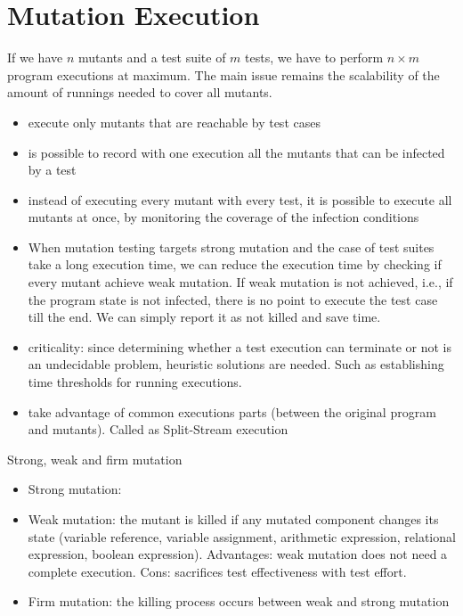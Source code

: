 
\section{Mutation Execution}\label{sec:execution}

If we have $n$ mutants and a test suite of $m$ tests, we have to perform $n \times m$ program executions at maximum.
The main issue remains the scalability of the amount of runnings needed to cover all mutants.

\begin{itemize}
	\item execute only mutants that are reachable by test cases
	\item is possible to record with one execution all the mutants that can be infected by a test
	\item instead of executing every mutant with every test, it is possible to execute all mutants at once, by monitoring the coverage of the infection conditions
	\item When mutation testing targets strong mutation and the case of test suites take a long execution time, we can reduce the execution time by checking if every mutant achieve weak mutation.
	If weak mutation is not achieved, i.e., if the program state is not infected, there is no point to execute the test case till the end. We can simply report it as not killed and save time.
	\item criticality: since determining whether a test execution can terminate or not is an undecidable problem, heuristic solutions are needed. Such as establishing time thresholds for running executions.
	\item take advantage of common executions parts (between the original program and mutants). Called as Split-Stream execution
\end{itemize} 

Strong, weak and firm mutation
\begin{itemize}
	\item Strong mutation:
	\item Weak mutation: the mutant is killed if any mutated component changes its state (variable reference, variable assignment, arithmetic expression, relational expression, boolean expression). Advantages: weak mutation does not need a complete execution. Cons: sacrifices test effectiveness with test effort.
	\item Firm mutation: the killing process occurs between weak and strong mutation
\end{itemize} 

